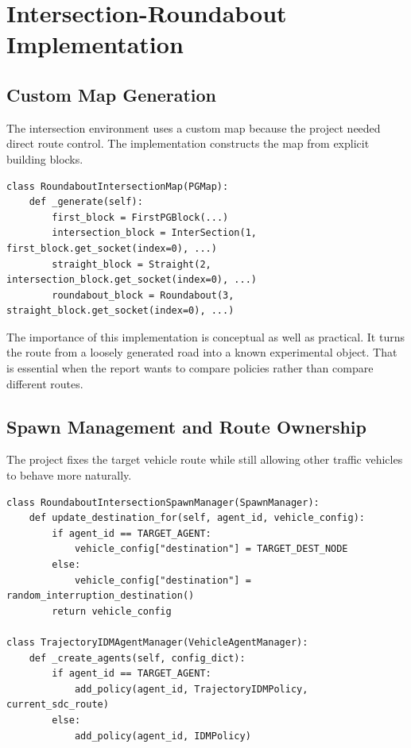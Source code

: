 \documentclass[12pt,a4paper]{report}
\begin{document}
\section{Intersection-Roundabout Implementation}

\subsection{Custom Map Generation}
The intersection environment uses a custom map because the project needed direct route control. The implementation constructs the map from explicit building blocks.

\begin{lstlisting}[caption={Custom block sequence for the intersection-roundabout map.},label={lst:intersection_map},float=H]
class RoundaboutIntersectionMap(PGMap):
    def _generate(self):
        first_block = FirstPGBlock(...)
        intersection_block = InterSection(1, first_block.get_socket(index=0), ...)
        straight_block = Straight(2, intersection_block.get_socket(index=0), ...)
        roundabout_block = Roundabout(3, straight_block.get_socket(index=0), ...)
\end{lstlisting}

The importance of this implementation is conceptual as well as practical. It turns the route from a loosely generated road into a known experimental object. That is essential when the report wants to compare policies rather than compare different routes.

\subsection{Spawn Management and Route Ownership}
The project fixes the target vehicle route while still allowing other traffic vehicles to behave more naturally.

\begin{lstlisting}[caption={Target-route control and surrounding-traffic assignment in the intersection scenario.},label={lst:intersection_agent_assign},float=H]
class RoundaboutIntersectionSpawnManager(SpawnManager):
    def update_destination_for(self, agent_id, vehicle_config):
        if agent_id == TARGET_AGENT:
            vehicle_config["destination"] = TARGET_DEST_NODE
        else:
            vehicle_config["destination"] = random_interruption_destination()
        return vehicle_config

class TrajectoryIDMAgentManager(VehicleAgentManager):
    def _create_agents(self, config_dict):
        if agent_id == TARGET_AGENT:
            add_policy(agent_id, TrajectoryIDMPolicy, current_sdc_route)
        else:
            add_policy(agent_id, IDMPolicy)
\end{lstlisting}
\end{document}
